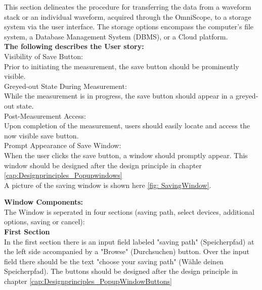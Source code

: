 \documentclass{scrreprt}
\begin{document}
This section delineates the procedure for transferring the data from a waveform stack or an individual waveform, acquired through the OmniScope, to a storage system via the user interface. The storage options encompass the computer's file system, a Database Management System (DBMS), or a Cloud platform.
\\

\textbf{The following describes the User story:} \\

Visibility of Save Button: \\

Prior to initiating the measurement, the save button should be prominently visible.\\

Greyed-out State During Measurement:\\

While the measurement is in progress, the save button should appear in a greyed-out state.\\

Post-Measurement Access:\\

Upon completion of the measurement, users should easily locate and access the now visible save button.\\

Prompt Appearance of Save Window:\\

When the user clicks the save button, a window should promptly appear. This window should be designed after the design principle in chapter \ref{cap:Designprinciples_Popupwindows}\\
A picture of the saving window is shown here \ref{fig: SavingWindow}.

\textbf{Window Components:}\\

The Window is seperated in four sections (saving path, select devices, additional options, saving or cancel): \\

\textbf{First Section}\\

In the first section there is an input field labeled "saving path" (Speicherpfad) at the left side accompanied by a "Browse" (Durchsuchen) button. Over the input field there should be the text "choose your saving path" (Wähle deinen Speicherpfad).  The buttons should be designed after the design principle in chapter \ref{cap:Designprinciples_PopupWindowButtons}\\
\end{document}

